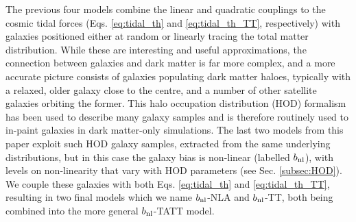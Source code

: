 The previous four models combine the linear and quadratic couplings to the cosmic tidal forces  (Eqs. \ref{eq:tidal_th} and \ref{eq:tidal_th_TT}, respectively) with galaxies positioned  either at random or linearly tracing the total matter distribution.
While these are interesting and useful approximations, the connection between galaxies and dark matter is far more complex, and a more accurate picture consists of galaxies populating dark matter haloes, typically with a relaxed, older galaxy close to the centre, and a number of other satellite galaxies orbiting the former.
This halo occupation distribution (HOD) formalism has been used to describe many galaxy samples \citep[\eg][]{SDSS-HOD, BOSS-HOD, GAMA-HOD, DESI-HOD} and is therefore routinely used to in-paint galaxies in dark matter-only simulations.
The last two models from this paper exploit such HOD galaxy samples, extracted from the same underlying distributions, but in this case the galaxy bias is non-linear (labelled $b_{\rm nl}$), with levels on non-linearity that vary with HOD parameters (see Sec. \ref{subsec:HOD}).
We couple these galaxies with both Eqs. \ref{eq:tidal_th} and \ref{eq:tidal_th_TT}, resulting in two final models which we name  $b_{\rm nl}$-NLA and  $b_{\rm nl}$-TT, both being combined into the more general  $b_{\rm nl}$-TATT model.



